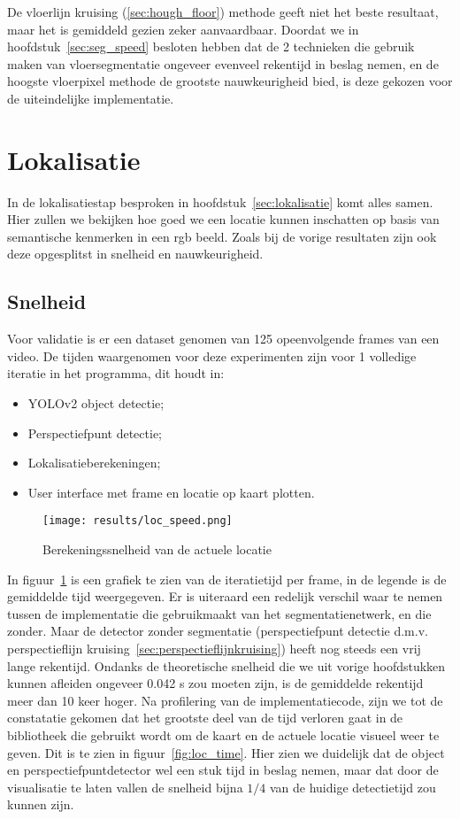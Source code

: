 De vloerlijn kruising (\ref{sec:hough_floor}) methode geeft niet het beste resultaat, maar het is gemiddeld gezien zeker aanvaardbaar.
Doordat we in hoofdstuk~\ref{sec:seg_speed} besloten hebben dat de 2 technieken die gebruik maken van vloersegmentatie ongeveer evenveel rekentijd in beslag
nemen, en de hoogste vloerpixel methode de grootste nauwkeurigheid bied, is deze gekozen voor de uiteindelijke implementatie.


\section{Lokalisatie}

In de lokalisatiestap besproken in hoofdstuk~\ref{sec:lokalisatie} komt alles samen.
Hier zullen we bekijken hoe goed we een locatie kunnen inschatten op basis van semantische kenmerken in een \gls{rgb} beeld.
Zoals bij de vorige resultaten zijn ook deze opgesplitst in snelheid en nauwkeurigheid.


\subsection{Snelheid}
Voor validatie is er een dataset genomen van 125 opeenvolgende frames van een video.
De tijden waargenomen voor deze experimenten zijn voor 1 volledige iteratie in het programma, dit houdt in:

\begin{itemize}
    \item YOLOv2 object detectie;
    \item Perspectiefpunt detectie;
    \item Lokalisatieberekeningen;
    \item User interface met frame en locatie op kaart plotten.
\end{itemize}

\begin{figure}[h]
    \centering
    \texttt{[image: results/loc\_speed.png]}
    \caption{Berekeningssnelheid van de actuele locatie}
    \label{fig:loc_speed}
\end{figure}

In figuur~\ref{fig:loc_speed} is een grafiek te zien van de iteratietijd per frame, in de legende is de gemiddelde tijd weergegeven.
Er is uiteraard een redelijk verschil waar te nemen tussen de implementatie die gebruikmaakt van het segmentatienetwerk, en die zonder.
Maar de detector zonder segmentatie (perspectiefpunt detectie d.m.v. perspectieflijn kruising~\ref{sec:perspectieflijnkruising}) heeft nog steeds
een vrij lange rekentijd.
Ondanks de theoretische snelheid die we uit vorige hoofdstukken kunnen afleiden ongeveer 0.042 s zou moeten zijn, is de gemiddelde rekentijd meer dan 10 keer hoger.
Na profilering van de implementatiecode, zijn we tot de constatatie gekomen dat het grootste deel van de tijd verloren gaat in de bibliotheek die gebruikt wordt
om de kaart en de actuele locatie visueel weer te geven. Dit is te zien in figuur~\ref{fig:loc_time}.
Hier zien we duidelijk dat de object en perspectiefpuntdetector wel een stuk tijd in beslag nemen, maar dat door de visualisatie te laten vallen
de snelheid bijna $1/4$ van de huidige detectietijd zou kunnen zijn.

